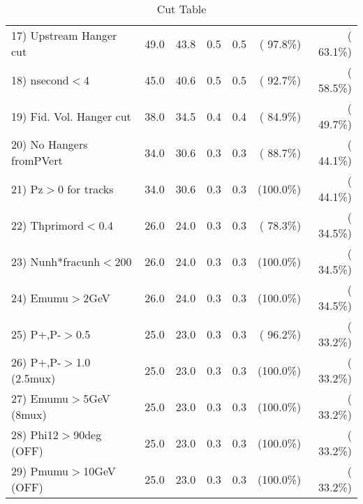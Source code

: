 \begin{table}[h!]
\begin{tabular}{||l||r|r|r|r|r|r||}
 17) Upstream Hanger cut  &         49.0 &         43.8 &          0.5 &          0.5 & ( 97.8\%) & ( 63.1\%) \\
 18) nsecond$<$4          &         45.0 &         40.6 &          0.5 &          0.5 & ( 92.7\%) & ( 58.5\%) \\
 19) Fid. Vol. Hanger cut &         38.0 &         34.5 &          0.4 &          0.4 & ( 84.9\%) & ( 49.7\%) \\
 20) No Hangers fromPVert &         34.0 &         30.6 &          0.3 &          0.3 & ( 88.7\%) & ( 44.1\%) \\
 21) Pz$>$0 for tracks    &         34.0 &         30.6 &          0.3 &          0.3 & (100.0\%) & ( 44.1\%) \\
 22) Thprimord$<$0.4      &         26.0 &         24.0 &          0.3 &          0.3 & ( 78.3\%) & ( 34.5\%) \\
 23) Nunh*fracunh$<$200   &         26.0 &         24.0 &          0.3 &          0.3 & (100.0\%) & ( 34.5\%) \\
 24) Emumu$>$2GeV         &         26.0 &         24.0 &          0.3 &          0.3 & (100.0\%) & ( 34.5\%) \\
 25) P+,P-$>$0.5          &         25.0 &         23.0 &          0.3 &          0.3 & ( 96.2\%) & ( 33.2\%) \\
 26) P+,P-$>$1.0 (2.5mux) &         25.0 &         23.0 &          0.3 &          0.3 & (100.0\%) & ( 33.2\%) \\
 27) Emumu$>$5GeV  (8mux) &         25.0 &         23.0 &          0.3 &          0.3 & (100.0\%) & ( 33.2\%) \\
 28) Phi12$>$90deg  (OFF) &         25.0 &         23.0 &          0.3 &          0.3 & (100.0\%) & ( 33.2\%) \\
 29) Pmumu$>$10GeV  (OFF) &         25.0 &         23.0 &          0.3 &          0.3 & (100.0\%) & ( 33.2\%) \\
 \hline
 \hline
 \end{tabular}
 \caption{Cut Table           }
 \label{tab-cutcohjpsi-mumu_anuecc}
 \end{table}
